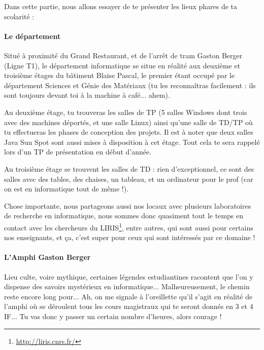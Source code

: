Dans cette partie, nous allons essayer de te présenter les lieux phares de ta scolarité : 

\paragraph{Le département}
Situé à proximité du Grand Restaurant, et de l'arrêt de tram Gaston Berger
(Ligne T1), le département informatique se situe en réalité aux deuxième et
troisième étages du bâtiment Blaise Pascal, le premier étant occupé par le
département Sciences et Génie des Matériaux (tu les reconnaîtras facilement :
ils sont toujours devant toi à la machine à café... ahem).

\vspace{1em}

Au deuxième étage, tu trouveras les salles de TP (5 salles Windows dont trois
avec des machines déportés, et une salle Linux) ainsi qu'une salle de
TD/TP où tu effectueras les phases de conception des projets. Il est à noter que deux
salles Java Sun Spot sont aussi mises à disposition à cet étage. Tout
cela te sera rappelé lors d'un TP de présentation en début d'année.

\vspace{1em}

Au troisième étage se trouvent les salles de TD : rien d'exceptionnel, ce sont
des salles avec des tables, des chaises, un tableau, et un ordinateur pour le
prof (car on est en informatique tout de même !).

\vspace{1em}

Chose importante, nous partageons aussi nos locaux avec plusieurs laboratoires
de recherche en informatique, nous sommes donc quasiment tout le temps en
contact avec les chercheurs du LIRIS\footnote{\url{http://liris.cnrs.fr/}}, entre
autres, qui sont aussi pour certains nos enseignants, et ça, c'est super 
pour ceux qui sont intéressés par ce domaine !

\paragraph{L'Amphi Gaston Berger}
Lieu culte, voire mythique, certaines légendes estudiantines racontent que l'on
y dispense des savoirs mystérieux en informatique... Malheureusement, le chemin reste
encore long pour... Ah, on me signale à l'oreillette qu'il s'agit en réalité de l'amphi où se
déroulent tous les cours magistraux qui te seront donnés en 3 et 4 IF... Tu
vas donc y passer un certain nombre d'heures, alors courage !

